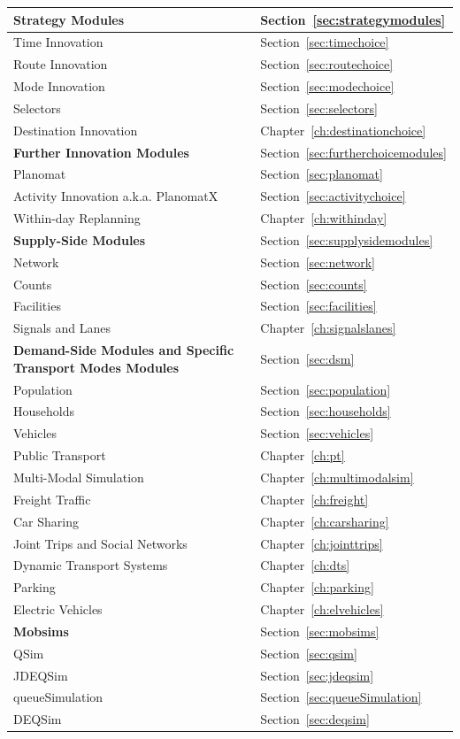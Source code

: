 {%
  \begin{tabular}[c]{|l|l|}
	\hline
	\textbf{Strategy Modules} & Section~\ref{sec:strategymodules} \\
	\hline
	Time Innovation & Section~\ref{sec:timechoice} \\
	Route Innovation & Section~\ref{sec:routechoice} \\
	Mode Innovation & Section~\ref{sec:modechoice} \\
	Selectors & Section~\ref{sec:selectors} \\
	Destination Innovation & Chapter~\ref{ch:destinationchoice} \\
	\hline
	\textbf{Further Innovation Modules} & Section~\ref{sec:furtherchoicemodules} \\
	\hline
	Planomat & Section~\ref{sec:planomat} \\
	Activity Innovation a.k.a. PlanomatX & Section~\ref{sec:activitychoice} \\
	Within-day Replanning & Chapter~\ref{ch:withinday} \\
	\hline
	\textbf{Supply-Side Modules} & Section~\ref{sec:supplysidemodules} \\
	\hline
	Network & Section~\ref{sec:network} \\
	Counts & Section~\ref{sec:counts} \\
	Facilities & Section~\ref{sec:facilities} \\
	Signals and Lanes & Chapter~\ref{ch:signalslanes} \\
	\hline
	\textbf{Demand-Side Modules and Specific Transport Modes Modules} & Section~\ref{sec:dsm} \\
	\hline
	Population & Section~\ref{sec:population} \\
	Households & Section~\ref{sec:households} \\
	Vehicles & Section~\ref{sec:vehicles} \\
	Public Transport & Chapter~\ref{ch:pt} \\
	Multi-Modal Simulation & Chapter~\ref{ch:multimodalsim} \\
	Freight Traffic & Chapter~\ref{ch:freight} \\
	Car Sharing & Chapter~\ref{ch:carsharing} \\
	Joint Trips and Social Networks & Chapter~\ref{ch:jointtrips} \\
	Dynamic Transport Systems & Chapter~\ref{ch:dts} \\
	Parking & Chapter~\ref{ch:parking} \\
	Electric Vehicles & Chapter~\ref{ch:elvehicles} \\
	\hline
	\textbf{Mobsims} & Section~\ref{sec:mobsims} \\
	\hline
	QSim & Section~\ref{sec:qsim} \\
	JDEQSim & Section~\ref{sec:jdeqsim} \\
	queueSimulation & Section~\ref{sec:queueSimulation} \\
	DEQSim & Section~\ref{sec:deqsim} \\
	\hline
	\end{tabular}
}%
{}

